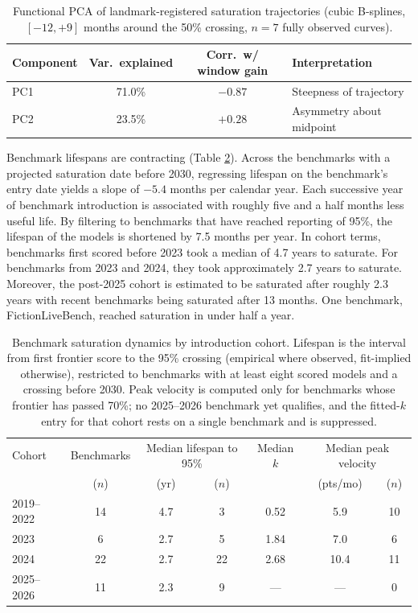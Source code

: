 \begin{table}[t]
\centering
\caption{Functional PCA of landmark-registered saturation trajectories (cubic B-splines, $[-12,+9]$ months around the 50\% crossing, $n=7$ fully observed curves).}
\label{tab:fpca}
\begin{tabular}{lccl}
\toprule
Component & Var.\ explained & Corr.\ w/ window gain & Interpretation \\
\midrule
PC1 & 71.0\% & $-0.87$ & Steepness of trajectory \\
PC2 & 23.5\% & $+0.28$ & Asymmetry about midpoint \\
\bottomrule
\end{tabular}
\end{table}

Benchmark lifespans are contracting (Table \ref{tab:cohorts}). Across the benchmarks with a projected saturation date before 2030, regressing lifespan on the benchmark's entry date yields a slope of $-5.4$ months per calendar year. Each successive year of benchmark introduction is associated with roughly five and a half months less useful life. By filtering to benchmarks that have reached reporting of 95\%, the lifespan of the models is shortened by 7.5 months per year. In cohort terms, benchmarks first scored before 2023 took a median of 4.7 years to saturate. For benchmarks from 2023 and 2024, they took approximately 2.7 years to saturate. Moreover, the post-2025 cohort is estimated to be saturated after roughly 2.3 years with recent benchmarks being saturated after 13 months. One benchmark, FictionLiveBench, reached saturation in under half a year.

\begin{table}[t]
\centering
\caption{Benchmark saturation dynamics by introduction cohort. Lifespan is the interval from first frontier score to the 95\% crossing (empirical where observed, fit-implied otherwise), restricted to benchmarks with at least eight scored models and a crossing before 2030. Peak velocity is computed only for benchmarks whose frontier has passed 70\%; no 2025--2026 benchmark yet qualifies, and the fitted-$k$ entry for that cohort rests on a single benchmark and is suppressed.}
\label{tab:cohorts}
\begin{tabular}{lcccccc}
\toprule
Cohort & Benchmarks & \multicolumn{2}{c}{Median lifespan to 95\%} & Median $k$ & \multicolumn{2}{c}{Median peak velocity} \\
 & ($n$) & (yr) & ($n$) & & (pts/mo) & ($n$) \\
\midrule
2019--2022 & 14 & 4.7 & 3  & 0.52 & 5.9  & 10 \\
2023       & 6  & 2.7 & 5  & 1.84 & 7.0  & 6  \\
2024       & 22 & 2.7 & 22 & 2.68 & 10.4 & 11 \\
2025--2026 & 11 & 2.3 & 9  & ---  & ---  & 0  \\
\bottomrule
\end{tabular}
\end{table}

